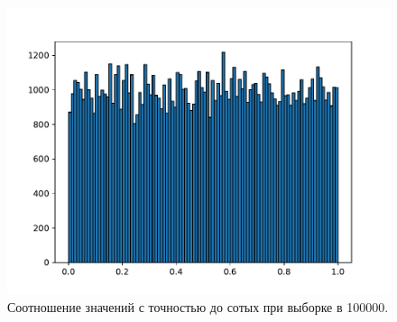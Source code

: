         \begin{figure}[H]
            \centering
            \includegraphics[width=14cm]{pictures/task3_2.pdf}
            \caption{Соотношение значений с точностью до сотых при выборке в 100000.}
        \end{figure}
        
        
